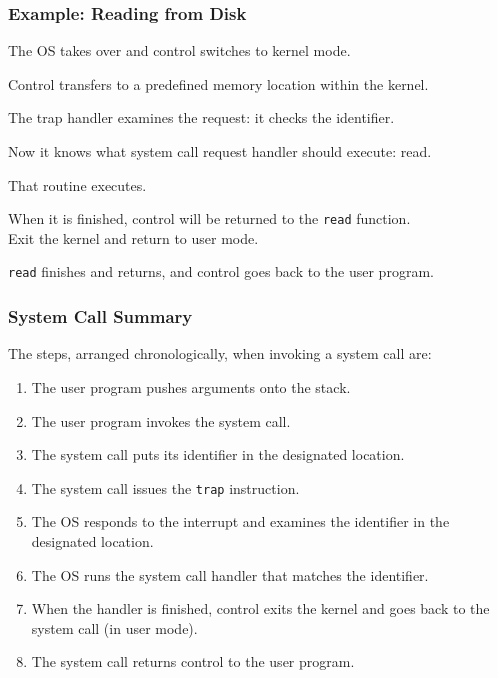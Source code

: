 \begin{frame}
\frametitle{Example: Reading from Disk}


The OS takes over and control switches to kernel mode. 

Control transfers to a predefined memory location within the kernel. 

The trap handler examines the request: it checks the identifier. 

Now it knows what system call request handler should execute: read. 

That routine executes. 

When it is finished, control will be returned to the \texttt{read} function.\\
\quad Exit the kernel and return to user mode.

\texttt{read} finishes and returns, and control goes back to the user program.


\end{frame}

\begin{frame}
\frametitle{System Call Summary}

The steps, arranged chronologically, when invoking a system call are:
\begin{enumerate}
	\item The user program pushes arguments onto the stack.
	\item The user program invokes the system call.
	\item The system call puts its identifier in the designated location.
	\item The system call issues the \texttt{trap} instruction.
	\item The OS responds to the interrupt and examines the identifier in the designated location.
	\item The OS runs the system call handler that matches the identifier.
	\item When the handler is finished, control exits the kernel and goes back to the system call (in user mode).
	\item The system call returns control to the user program.

\end{enumerate}


\end{frame}








